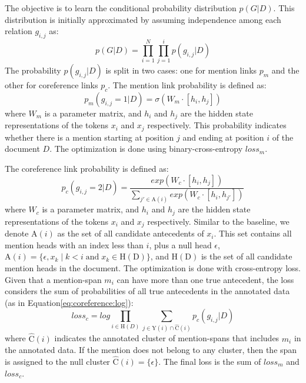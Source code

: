 \documentclass[11pt]{article}
\begin{document}
The objective is to learn the conditional probability distribution $p(G|D)$. This distribution is initially approximated by assuming independence among each relation $g_{i,j}$ as:
\begin{equation}\label{eq:coreference:p-dist}
p(G|D) = \prod_{i=1}^N \prod_{j=1}^i p(g_{i,j}|D)
\end{equation}
The probability $p(g_{i,j}|D)$ is split in two cases: one for mention links $p_m$ and the other for coreference links $p_c$. The mention link probability is defined as:
\begin{equation}
p_m(g_{i,j}{=}1|D) =  \sigma (W_m \cdot [h_i, h_j])
\end{equation}
where $W_m$ is a parameter matrix, and $h_i$ and $h_j$ are the hidden state representations of the tokens $x_i$ and $x_j$ respectively. This probability indicates whether there is a mention starting at position $j$ and ending at position $i$ of the document $D$. The optimization is done using binary-cross-entropy $loss_m$.


The coreference link probability is defined as:
\begin{equation}
p_c(g_{i,j}{=}2|D) = \frac{exp(W_c \cdot [h_i, h_j])}{\sum_{j' \in \mathrm{A}(i)} exp(W_c \cdot [h_i, h_{j'}])}
\end{equation}
where $W_c$ is a parameter matrix, and $h_i$ and $h_j$ are the hidden state representations of the tokens $x_i$ and $x_j$ respectively. Similar to the baseline, we denote $\mathrm{A}(i)$ as the set of all candidate antecedents of $x_i$. This set contains all mention heads with an index less than $i$, plus a null head $\epsilon$, $\mathrm{A}(i) = \{\epsilon, x_k \; | \; k<i \; \text{and} \; x_k \in \mathrm{H(D)} \} $, and $\mathrm{H(D)}$ is the set of all candidate mention heads in the document. The optimization is done with cross-entropy loss. Given that a mention-span $m_i$ can have more than one true antecedent, the loss considers the sum of probabilities of all true antecedents in the annotated data (as in Equation\eqref{eq:coreference:log}): 
\begin{equation}
loss_c = log \prod_{i \in \mathrm{H}(D)} \sum_{j \in \mathrm{Y}(i) \cap \mathrm{\hat{C}}(i)} p_c(g_{i,j}|D)
\end{equation}
where $\mathrm{\hat{C}}(i)$ indicates the annotated cluster of mention-spans that includes $m_i$ in the annotated data. If the mention does not belong to any cluster, then the span is assigned to the null cluster $\mathrm{\hat{C}}(i)=\{\epsilon\}$. The final loss is the sum of $loss_m$ and $loss_c$.
\end{document}
